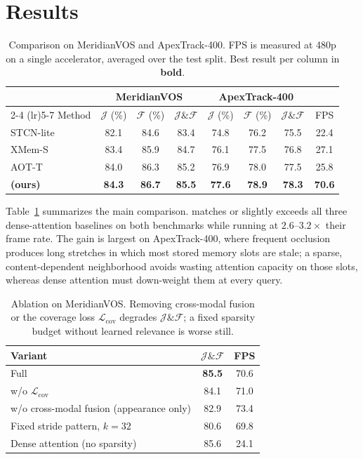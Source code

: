 \section{Results}
\label{sec:results}

\begin{table}[t]
\centering
\caption{Comparison on MeridianVOS and ApexTrack-400. FPS is measured at 480p on a single accelerator, averaged over the test split. Best result per column in \textbf{bold}.}
\label{tab:results}
\small
\begin{tabular}{lccccccc}
\toprule
& \multicolumn{3}{c}{MeridianVOS} & \multicolumn{3}{c}{ApexTrack-400} & \\
\cmidrule(lr){2-4} \cmidrule(lr){5-7}
Method & $\mathcal{J}$ (\%) & $\mathcal{F}$ (\%) & $\mathcal{J}\&\mathcal{F}$ & $\mathcal{J}$ (\%) & $\mathcal{F}$ (\%) & $\mathcal{J}\&\mathcal{F}$ & FPS \\
\midrule
STCN-lite~\cite{castillo2022stcn}   & 82.1 & 84.6 & 83.4 & 74.8 & 76.2 & 75.5 & 22.4 \\
XMem-S~\cite{adebayo2024xmem}       & 83.4 & 85.9 & 84.7 & 76.1 & 77.5 & 76.8 & 27.1 \\
AOT-T~\cite{nathan2024aot}          & 84.0 & 86.3 & 85.2 & 76.9 & 78.0 & 77.5 & 25.8 \\
\midrule
\textbf{\methodname{} (ours)} & \textbf{84.3} & \textbf{86.7} & \textbf{85.5} & \textbf{77.6} & \textbf{78.9} & \textbf{78.3} & \textbf{70.6} \\
\bottomrule
\end{tabular}
\end{table}

Table~\ref{tab:results} summarizes the main comparison. \methodname{} matches or slightly exceeds all three dense-attention baselines on both benchmarks while running at $2.6$--$3.2\times$ their frame rate. The gain is largest on ApexTrack-400, where frequent occlusion produces long stretches in which most stored memory slots are stale; a sparse, content-dependent neighborhood avoids wasting attention capacity on those slots, whereas dense attention must down-weight them at every query.

\begin{table}[t]
\centering
\caption{Ablation on MeridianVOS. Removing cross-modal fusion or the coverage loss $\mathcal{L}_{\mathrm{cov}}$ degrades $\mathcal{J}\&\mathcal{F}$; a fixed sparsity budget without learned relevance is worse still.}
\label{tab:ablation}
\small
\begin{tabular}{lcc}
\toprule
Variant & $\mathcal{J}\&\mathcal{F}$ & FPS \\
\midrule
Full \methodname{} & \textbf{85.5} & 70.6 \\
w/o $\mathcal{L}_{\mathrm{cov}}$ & 84.1 & 71.0 \\
w/o cross-modal fusion (appearance only) & 82.9 & 73.4 \\
Fixed stride pattern, $k=32$ & 80.6 & 69.8 \\
Dense attention (no sparsity) & 85.6 & 24.1 \\
\bottomrule
\end{tabular}
\end{table}

